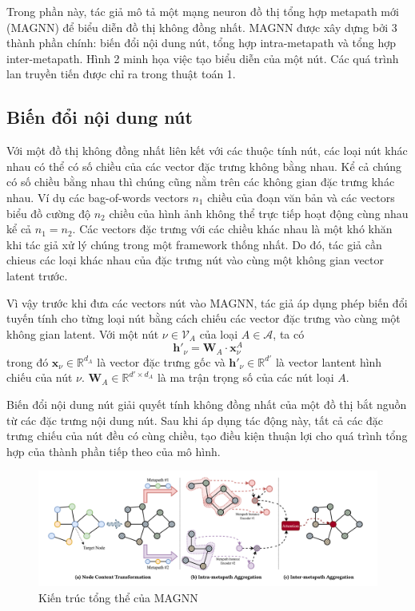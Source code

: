 Trong phần này, tác giả mô tả một mạng neuron đồ thị tổng hợp metapath mới (MAGNN) để biểu diễn đồ thị không đồng nhất. MAGNN được xây dựng bởi 3 thành phần chính: biến đổi nội dung nút, tổng hợp intra-metapath và tổng hợp inter-metapath. Hình 2 minh họa việc tạo biểu diễn của một nút. Các quá trình lan truyền tiến được chỉ ra trong thuật toán 1.

\subsection{Biến đổi nội dung nút}
Với một đồ thị không đồng nhất liên kết với các thuộc tính nút, các loại nút khác nhau có thể có số chiều của các vector đặc trưng không bằng nhau. Kể cả chúng có số chiều bằng nhau thì chúng cũng nằm trên các không gian đặc trưng khác nhau. Ví dụ các bag-of-words vectors $n_1$ chiều của đoạn văn bản và các vectors biểu đồ cường độ $n_2$ chiều của hình ảnh không thể trực tiếp hoạt động cùng nhau kể cả $n_1 = n_2$. Các vectors đặc trưng với các chiều khác nhau là một khó khăn khi tác giả xử lý chúng trong một framework thống nhất. Do đó, tác giả cần chieus các loại khác nhau của đặc trưng nút vào cùng một không gian vector latent trước.

Vì vậy trước khi đưa các vectors nút vào MAGNN, tác giả áp dụng phép biến đổi tuyến tính cho từng loại nút bằng cách chiếu các vector đặc trưng vào cùng một không gian latent. Với một nút $\nu \in \pmb{\mathcal{V}}_A$ của loại $A \in \pmb{\mathcal{A}}$, ta có
\begin{equation}
  \label{eq:01}
  \mathbf{h'}_{\nu} = \mathbf{W}_A \cdot \mathbf{x}^A_{\nu}
\end{equation}
trong đó $\mathbf{x}_{\nu} \in \mathbb{R}^{d_A}$ là vector đặc trưng gốc và $\mathbf{h'}_{\nu} \in \mathbb{R}^{d'}$ là vector lantent hình chiếu  của nút $\nu$. $\mathbf{W}_A \in \mathbb{R}^{d' \times d_A}$ là ma trận trọng số của các nút loại $A$.

Biến đổi nội dung nút giải quyết tính không đồng nhất của một đồ thị bắt nguồn từ các đặc trưng nội dung nút. Sau khi áp dụng tác động này, tất cả các đặc trưng chiếu của nút đều có cùng chiều, tạo điều kiện thuận lợi cho quá trình tổng hợp của thành phần tiếp theo của mô hình. 

\begin{figure}
  \label{fig:02}
  \includegraphics[width=\textwidth]{figs/fig2.png}
  \caption{Kiến trúc tổng thể của MAGNN}
\end{figure}

